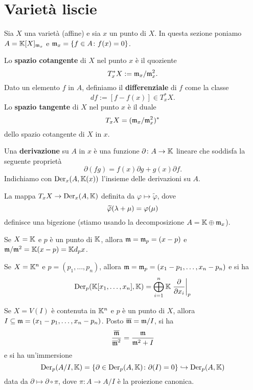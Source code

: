 \section{Variet\`a liscie}
\begin{notation}
Sia $X$ una varietà (affine) e sia $x$ un punto di $X$. In questa sezione poniamo $A=\mathbb{K}[X]_{\mathfrak{m}_x}$ e $\mathfrak{m}_x=\{f\in A\colon f(x)=0\}$.
\end{notation}


\begin{definition}
    Lo \textbf{spazio cotangente} di $X$ nel punto $x$ è il quoziente 
    \[T^\ast_x X:= \mathfrak{m}_x/\mathfrak{m}_x^2.\]
    Dato un elemento $f$ in $A$, definiamo il \textbf{differenziale} di $f$ come la classe 
    \[df:= [f-f(x)]\in T^\ast_x X.\] 
    Lo \textbf{spazio tangente} di $X$ nel punto $x$ è il duale 
    \[T_x X=(\mathfrak{m}_x/\mathfrak{m}_x^2)^\ast\]
    dello spazio cotangente di $X$ in $x$.
\end{definition}

\begin{definition}
    Una \textbf{derivazione} su $A$ in $x$ è una funzione $\partial\colon A \to \mathbb{K}$ lineare che soddisfa la seguente proprietà \[\partial(fg)=f(x)\partial g + g(x)\partial f.\]
    Indichiamo con $\operatorname{Der}_x(A,\mathbb{K}(x))$ l'insieme delle derivazioni su $A$.
\end{definition}

\begin{exercise}
    La mappa $T_xX \to \operatorname{Der}_x(A,\mathbb{K})$ definita da $\varphi\mapsto \widetilde{\varphi}$, dove \[\widetilde{\varphi}(\lambda+\mu)=\varphi(\mu)\] definisce una bigezione (stiamo usando la decomposizione $A=\mathbb{K}\oplus \mathfrak{m}_x$).
\end{exercise}

\begin{example}
    Se $X=\mathbb{K}$ e $p$ è un punto di $\mathbb{K}$, allora $\mathfrak{m}=\mathfrak{m}_p=(x-p)$ e $\mathfrak{m}/\mathfrak{m}^2=\mathbb{K}(x-p)=\mathbb{K} d_p x$.
\end{example}

\begin{example}
    Se $X=\mathbb{K}^n$ e $p=(p_1,\ldots,p_n)$, allora $\mathfrak{m}=\mathfrak{m}_p=(x_1-p_1,\ldots,x_n-p_n)$ e si ha \[\operatorname{Der}_p(\mathbb{K}[x_1,\ldots,x_n],\mathbb{K})=\bigoplus_{i=1}^n \mathbb{K} \left.\frac{\partial}{\partial x_i}\right\lvert_{p}\]
\end{example}

\begin{example}
    Se $X=V(I)$ è contenuta in $\mathbb{K}^n$ e $p$ è un punto di $X$, allora $I\subseteq \mathfrak{m}=(x_1-p_1,\ldots,x_n-p_n)$. Posto $\overline{\mathfrak{m}}=\mathfrak{m}/I$, si ha \[\frac{\overline{\mathfrak{m}}}{\overline{\mathfrak{m}}^2}=\frac{\mathfrak{m}}{\mathfrak{m}^2+I} \] e si ha un'immersione 
    \[\operatorname{Der}_p(A/I,\mathbb{K})=\left\{\partial\in \operatorname{Der}_p(A,\mathbb{K}) \colon \partial(I)=0\right\}\hookrightarrow \operatorname{Der}_p(A,\mathbb{K}) \]
    data da $\partial\mapsto \partial\circ \pi$, dove $\pi\colon A \to A/I$ è la proiezione canonica.
\end{example}

